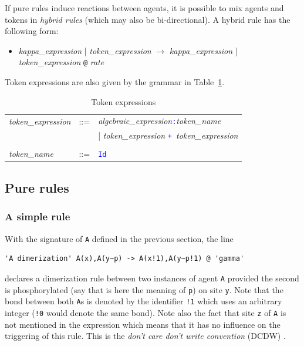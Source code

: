 \documentclass[11pt]{book}
\def\tcb#1{\textcolor{blue}{\ttt{#1}}}
\def\ttt#1{\texttt{#1}}
\def\rar{\rightarrow}
\def\ITE#1{\begin{itemize}#1\end{itemize}}
\def\imp#1{\emph{#1}\index{#1}}
\begin{document}
If pure rules induce reactions between agents, it is possible to mix
agents and tokens in \imp{hybrid rules} (which may also be
bi-directional). A hybrid rule has the following form:

\ITE{
\item[] {\it kappa\_expression} | {\it token\_expression} $\rar$ {\it kappa\_expression}  | {\it token\_expression }\ttt{@} {\it rate}
}

Token expressions are also given by the grammar in
Table~\ref{tab:tokens}.
\begin{table}[ht!]
  \centering
  \caption{Token expressions}
  \begin{tabular}{@{} lcl @{}}
   \textit{token\_expression} &::=&  \textit{algebraic\_expression}\tcb{:}\textit{token\_name} \\
	&&|  \textit{token\_expression} \tcb{+}\ \textit{token\_expression} \\\\
   \textit{token\_name} &::=& \tcb{Id}\\
  \end{tabular}
  \label{tab:tokens}
\end{table}

\subsection{Pure rules}

\subsubsection*{A simple rule}
With the signature of \ttt{A} defined in the previous section, the line
\begin{lstlisting}[language=kappa]
'A dimerization' A(x),A(y~p) -> A(x!1),A(y~p!1) @ 'gamma'
\end{lstlisting}
declares a dimerization rule between two instances of agent \ttt{A} provided the second is phosphorylated (say that is here the meaning of \ttt{p}) on site \ttt{y}. Note that the bond between both \ttt{A}s is denoted by the identifier \ttt{!1} which uses an arbitrary integer (\ttt{!0} would denote the same bond). Note also the fact that site \ttt{z} of \ttt{A} is not mentioned in the expression which means that it has no influence on the triggering of this rule. This is the \emph{don't care don't write convention} (DCDW) .
\end{document}
